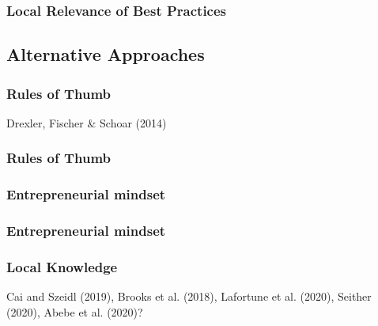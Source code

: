 \documentclass[hideothersubsections, usenames,dvipsnames,11pt]{beamer}
\newenvironment{itemize_3pt}{\itemize\addtolength{\itemsep}{3pt}}{\enditemize}
\begin{document}
\begin{frame}
\frametitle{Local Relevance of Best Practices}
	\begin{itemize_3pt}
	\item 
	\vspace{0.1in}
	\end{itemize_3pt}
\end{frame}


\subsection{Alternative Approaches}

\begin{frame}
\frametitle{Rules of Thumb}
	\begin{itemize_3pt}
	\item Drexler, Fischer \& Schoar (2014) \citep{Drexler2014}
	\vspace{0.1in}
	\end{itemize_3pt}
\end{frame}

\begin{frame}
\frametitle{Rules of Thumb}
	\begin{itemize_3pt}
	\item \citep{Arraiz2019} \citep{Cole2019}
	\vspace{0.1in}
	\end{itemize_3pt}
\end{frame}

%

\begin{frame}
\frametitle{Entrepreneurial mindset}
	\begin{itemize_3pt}
	\item \citep{Campos2017}
	\vspace{0.1in}
	\end{itemize_3pt}
\end{frame}

\begin{frame}
\frametitle{Entrepreneurial mindset}
	\begin{itemize_3pt}
	\item \citep{Alibhai2019} \citep{Ubfal2019}
	\vspace{0.1in}
	\end{itemize_3pt}
\end{frame}


\begin{frame}
\frametitle{Local Knowledge}
	\begin{itemize_3pt}
	\item Cai and Szeidl (2019), Brooks et al. (2018), Lafortune et al. (2020), Seither (2020), Abebe et al. (2020)?
	\vspace{0.1in}
	\end{itemize_3pt}
\end{frame}
\end{document}
